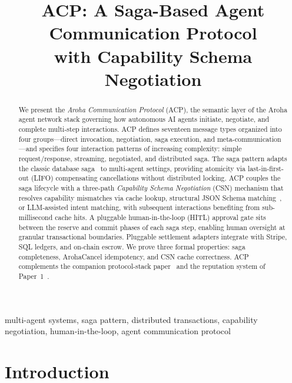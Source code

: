 \documentclass[conference]{IEEEtran}
\begin{document}
\title{ACP: A Saga-Based Agent Communication Protocol\\
       with Capability Schema Negotiation}

\author{
}

\maketitle

\begin{abstract}
We present the \emph{Aroha Communication Protocol} (ACP), the semantic
layer of the Aroha agent network stack governing how autonomous AI
agents initiate, negotiate, and complete multi-step interactions.
ACP defines seventeen message types organized into four groups—direct
invocation, negotiation, saga execution, and meta-communication—and
specifies four interaction patterns of increasing complexity: simple
request/response, streaming, negotiated, and distributed saga.  The
saga pattern adapts the classic database saga~\cite{garcia1987sagas}
to multi-agent settings, providing atomicity via last-in-first-out
(LIFO) compensating cancellations without distributed locking.  ACP
couples the saga lifecycle with a three-path \emph{Capability Schema
Negotiation} (CSN) mechanism that resolves capability mismatches via
cache lookup, structural JSON Schema matching~\cite{w3cjsonschema}, or
LLM-assisted intent matching, with subsequent interactions benefiting
from sub-millisecond cache hits.  A pluggable human-in-the-loop (HITL)
approval gate sits between the reserve and commit phases of each saga
step, enabling human oversight at granular transactional boundaries.
Pluggable settlement adapters integrate with Stripe, SQL ledgers, and
on-chain escrow.  We prove three formal properties: saga completeness,
ArohaCancel idempotency, and CSN cache correctness.  ACP complements
the companion protocol-stack paper~\cite{aroha2025p5} and the
reputation system of Paper~1~\cite{aroha2025p1}.
\end{abstract}

\begin{IEEEkeywords}
multi-agent systems, saga pattern, distributed transactions, capability
negotiation, human-in-the-loop, agent communication protocol
\end{IEEEkeywords}

\section{Introduction}
\label{sec:intro}
\end{document}
